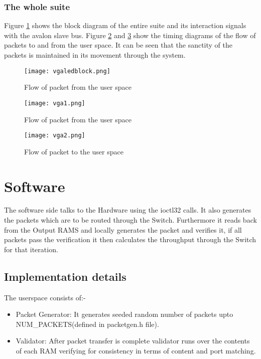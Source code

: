 \documentclass[twoside,12pt,fleqn]{book} %
\begin{document}
\subsection{The whole suite}
Figure \ref{fig:vgablock} shows the block diagram of the entire suite and its interaction signals with the avalon slave bus. Figure \ref{fig:vga1} and \ref{fig:vga2} show the timing diagrams of the flow of packets to and from the user space. It can be seen that the sanctity of the packets is maintained in its movement through the system.
\begin{figure}[ht]
    \centering
    \texttt{[image: vgaledblock.png]}
    \caption{Flow of packet from the user space}
    \label{fig:vgablock}
\end{figure}
\begin{figure}[ht]
    \centering
    \texttt{[image: vga1.png]}
    \caption{Flow of packet from the user space}
    \label{fig:vga1}
\end{figure}
\begin{figure}[ht]
    \centering
    \texttt{[image: vga2.png]}
    \caption{Flow of packet to the user space}
    \label{fig:vga2}
\end{figure}

\chapter{Software}
The software side talks to the Hardware using the ioctl32 calls. It also generates the packets which are to be routed through the Switch. Furthermore it reads back from the Output RAMS and locally generates the packet and verifies it, if all packets pass the verification it then calculates the throughput through the Switch for that iteration.
\section{Implementation details }
The userspace consists of:-
\begin{itemize}
    \item Packet Generator: It generates seeded random number of packets upto NUM\_PACKETS(defined in packetgen.h file). 
    \item Validator: After packet transfer is complete validator runs over the contents of each RAM verifying for consistency in terms of content and port matching.
\end{itemize}
\end{document}
